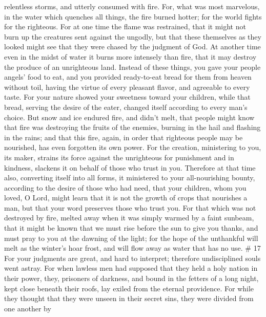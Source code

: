relentless storms, and utterly consumed with fire.  For,
what was most marvelous, in the water which quenches all things, the
fire burned hotter; for the world fights for the righteous.
 For at one time the flame was restrained, that it might
not burn up the creatures sent against the ungodly, but that these
themselves as they looked might see that they were chased by the
judgment of God.  At another time even in the midst of
water it burns more intensely than fire, that it may destroy the produce
of an unrighteous land.  Instead of these things, you gave
your people angels' food to eat, and you provided ready-to-eat bread for
them from heaven without toil, having the virtue of every pleasant
flavor, and agreeable to every taste.  For your nature
showed your sweetness toward your children, while that bread, serving
the desire of the eater, changed itself according to every man's choice.
 But snow and ice endured fire, and didn't melt, that
people might know that fire was destroying the fruits of the enemies,
burning in the hail and flashing in the rains;  and that
this fire, again, in order that righteous people may be nourished, has
even forgotten its own power.  For the creation,
ministering to you, its maker, strains its force against the unrighteous
for punishment and in kindness, slackens it on behalf of those who trust
in you.  Therefore at that time also, converting itself
into all forms, it ministered to your all-nourishing bounty, according
to the desire of those who had need,  that your children,
whom you loved, O Lord, might learn that it is not the growth of crops
that nourishes a man, but that your word preserves those who trust you.
 For that which was not destroyed by fire, melted away when
it was simply warmed by a faint sunbeam,  that it might be
known that we must rise before the sun to give you thanks, and must pray
to you at the dawning of the light;  for the hope of the
unthankful will melt as the winter's hoar frost, and will flow away as
water that has no use. \# 17  For your judgments are great,
and hard to interpret; therefore undisciplined souls went astray.
 For when lawless men had supposed that they held a holy
nation in their power, they, prisoners of darkness, and bound in the
fetters of a long night, kept close beneath their roofs, lay exiled from
the eternal providence.  For while they thought that they
were unseen in their secret sins, they were divided from one another by

